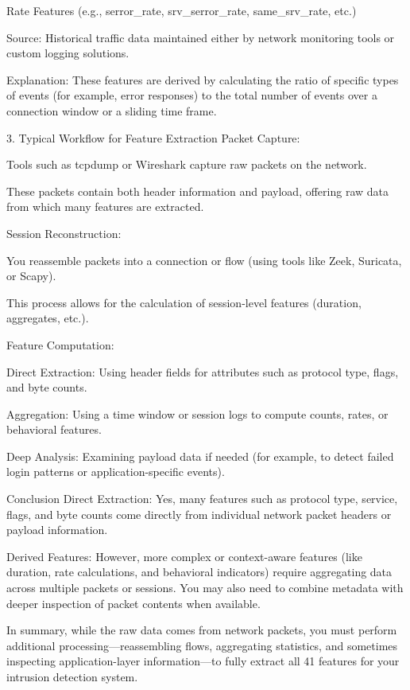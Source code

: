 \documentclass{article}
\begin{document}
Rate Features (e.g., serror_rate, srv_serror_rate, same_srv_rate, etc.)

Source: Historical traffic data maintained either by network monitoring tools or custom logging solutions.

Explanation: These features are derived by calculating the ratio of specific types of events (for example, error responses) to the total number of events over a connection window or a sliding time frame.

3. Typical Workflow for Feature Extraction
Packet Capture:

Tools such as tcpdump or Wireshark capture raw packets on the network.

These packets contain both header information and payload, offering raw data from which many features are extracted.

Session Reconstruction:

You reassemble packets into a connection or flow (using tools like Zeek, Suricata, or Scapy).

This process allows for the calculation of session-level features (duration, aggregates, etc.).

Feature Computation:

Direct Extraction: Using header fields for attributes such as protocol type, flags, and byte counts.

Aggregation: Using a time window or session logs to compute counts, rates, or behavioral features.

Deep Analysis: Examining payload data if needed (for example, to detect failed login patterns or application-specific events).

Conclusion
Direct Extraction: Yes, many features such as protocol type, service, flags, and byte counts come directly from individual network packet headers or payload information.

Derived Features: However, more complex or context-aware features (like duration, rate calculations, and behavioral indicators) require aggregating data across multiple packets or sessions. You may also need to combine metadata with deeper inspection of packet contents when available.

In summary, while the raw data comes from network packets, you must perform additional processing—reassembling flows, aggregating statistics, and sometimes inspecting application-layer information—to fully extract all 41 features for your intrusion detection system.
\end{document}

